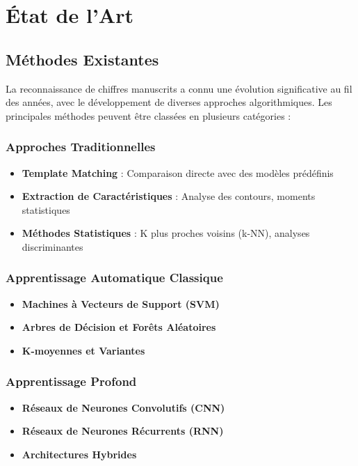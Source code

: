 \chapter{État de l'Art}

\section{Méthodes Existantes}

La reconnaissance de chiffres manuscrits a connu une évolution significative au fil des années, avec le développement de diverses approches algorithmiques. Les principales méthodes peuvent être classées en plusieurs catégories :

\subsection{Approches Traditionnelles}
\begin{itemize}
    \item \textbf{Template Matching} : Comparaison directe avec des modèles prédéfinis
    \item \textbf{Extraction de Caractéristiques} : Analyse des contours, moments statistiques
    \item \textbf{Méthodes Statistiques} : K plus proches voisins (k-NN), analyses discriminantes
\end{itemize}

\subsection{Apprentissage Automatique Classique}
\begin{itemize}
    \item \textbf{Machines à Vecteurs de Support (SVM)}
    \item \textbf{Arbres de Décision et Forêts Aléatoires}
    \item \textbf{K-moyennes et Variantes}
\end{itemize}

\subsection{Apprentissage Profond}
\begin{itemize}
    \item \textbf{Réseaux de Neurones Convolutifs (CNN)}
    \item \textbf{Réseaux de Neurones Récurrents (RNN)}
    \item \textbf{Architectures Hybrides}
\end{itemize}

